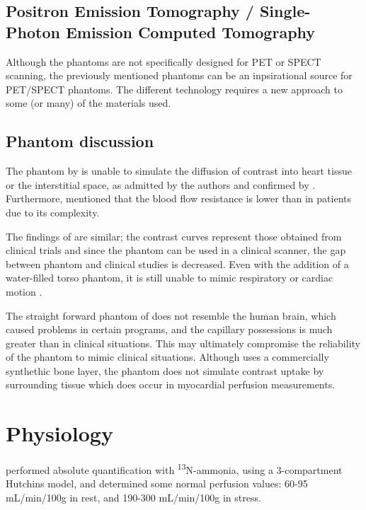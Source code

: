 \subsection{Positron Emission Tomography / Single-Photon Emission Computed Tomography}
Although the phantoms are not specifically designed for \ac{PET} or \ac{SPECT} scanning, the previously mentioned phantoms can be an inpsirational source for \ac{PET}/\ac{SPECT} phantoms. The different technology requires a new approach to some (or many) of the materials used.

\subsection{Phantom discussion}
The phantom by \cite{chiribiri2013perfusion} is unable to simulate the diffusion of contrast into heart tissue or the interstitial space, as admitted by the authors and confirmed by \cite{otton2013direct, o2017effect}. Furthermore, \cite{chiribiri2013perfusion} mentioned that the blood flow resistance is lower than in patients due to its complexity.

The findings of \cite{otton2013direct} are similar; the contrast curves represent those obtained from clinical trials and since the phantom can be used in a clinical  scanner, the gap between phantom and clinical studies is decreased. Even with the addition of a water-filled torso phantom, it is still unable to mimic respiratory or cardiac motion \citep{o2017feasibility}.

The straight forward phantom of \cite{suzuki2017quantitative} does not resemble the human brain, which caused problems in certain programs, and the capillary possessions is much greater than in clinical situations. This may ultimately compromise the reliability of the phantom to mimic clinical situations. Although \cite{hashimoto2018effect} uses a commercially synthethic bone layer, the phantom does not simulate contrast uptake by surrounding tissue which does occur in myocardial perfusion measurements.
\section{Physiology}
\cite{slart2015Pres} performed absolute quantification with \textsuperscript{13}N-ammonia, using a 3-compartment Hutchins model, and determined some normal perfusion values: 60-95 mL/min/100g in rest, and 190-300 mL/min/100g in stress.

